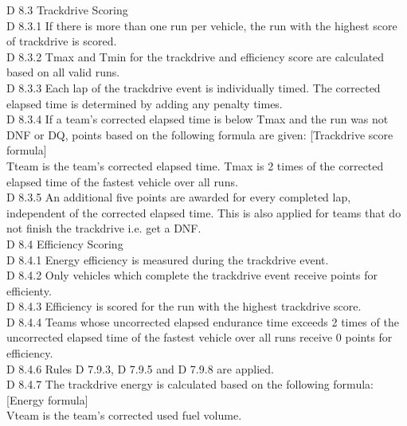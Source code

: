 \documentclass{article}
\begin{document}
D 8.3 Trackdrive Scoring\\

D 8.3.1 If there is more than one run per vehicle, the run with the highest score of trackdrive is scored.\\

D 8.3.2 Tmax and Tmin for the trackdrive and efficiency score are calculated based on all valid runs.\\

D 8.3.3 Each lap of the trackdrive event is individually timed. The corrected elapsed time is determined by adding any penalty times.\\

D 8.3.4 If a team's corrected elapsed time is below Tmax and the run was not  DNF or DQ, points based on the following formula are given: [Trackdrive score formula]\\
	Tteam is the team's corrected elapsed time.
	Tmax is 2 times of the corrected  elapsed time of the fastest vehicle over all runs.\\

D 8.3.5 An additional five points are awarded for every completed lap, independent of the corrected elapsed time. This is also applied for teams that do not finish the trackdrive i.e. get a DNF.\\

D 8.4 Efficiency Scoring\\

D 8.4.1 Energy efficiency is measured during the trackdrive event.\\

D 8.4.2 Only vehicles which complete the trackdrive event receive points for efficienty.\\

D 8.4.3 Efficiency is scored for the run with the highest trackdrive score.\\

D 8.4.4 Teams whose uncorrected elapsed endurance time exceeds 2 times of the uncorrected elapsed time of the fastest vehicle over all runs receive 0 points for efficiency.\\

D 8.4.6 Rules D 7.9.3, D 7.9.5 and D 7.9.8 are applied.\\

D 8.4.7 The trackdrive energy is calculated based on the following formula: [Energy formula]\\
	Vteam is the team's corrected used fuel volume.\\
\end{document}
